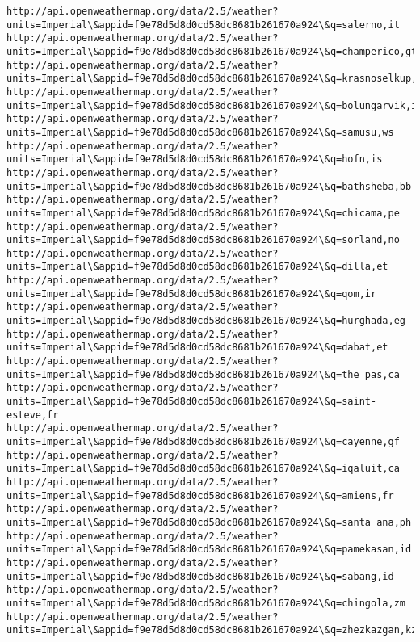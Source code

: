 \documentclass[11pt]{article}
\begin{document}
\begin{Verbatim}[commandchars=\\\{\}]
http://api.openweathermap.org/data/2.5/weather?units=Imperial\&appid=f9e78d5d8d0cd58dc8681b261670a924\&q=salerno,it
http://api.openweathermap.org/data/2.5/weather?units=Imperial\&appid=f9e78d5d8d0cd58dc8681b261670a924\&q=champerico,gt
http://api.openweathermap.org/data/2.5/weather?units=Imperial\&appid=f9e78d5d8d0cd58dc8681b261670a924\&q=krasnoselkup,ru
http://api.openweathermap.org/data/2.5/weather?units=Imperial\&appid=f9e78d5d8d0cd58dc8681b261670a924\&q=bolungarvik,is
http://api.openweathermap.org/data/2.5/weather?units=Imperial\&appid=f9e78d5d8d0cd58dc8681b261670a924\&q=samusu,ws
http://api.openweathermap.org/data/2.5/weather?units=Imperial\&appid=f9e78d5d8d0cd58dc8681b261670a924\&q=hofn,is
http://api.openweathermap.org/data/2.5/weather?units=Imperial\&appid=f9e78d5d8d0cd58dc8681b261670a924\&q=bathsheba,bb
http://api.openweathermap.org/data/2.5/weather?units=Imperial\&appid=f9e78d5d8d0cd58dc8681b261670a924\&q=chicama,pe
http://api.openweathermap.org/data/2.5/weather?units=Imperial\&appid=f9e78d5d8d0cd58dc8681b261670a924\&q=sorland,no
http://api.openweathermap.org/data/2.5/weather?units=Imperial\&appid=f9e78d5d8d0cd58dc8681b261670a924\&q=dilla,et
http://api.openweathermap.org/data/2.5/weather?units=Imperial\&appid=f9e78d5d8d0cd58dc8681b261670a924\&q=qom,ir
http://api.openweathermap.org/data/2.5/weather?units=Imperial\&appid=f9e78d5d8d0cd58dc8681b261670a924\&q=hurghada,eg
http://api.openweathermap.org/data/2.5/weather?units=Imperial\&appid=f9e78d5d8d0cd58dc8681b261670a924\&q=dabat,et
http://api.openweathermap.org/data/2.5/weather?units=Imperial\&appid=f9e78d5d8d0cd58dc8681b261670a924\&q=the pas,ca
http://api.openweathermap.org/data/2.5/weather?units=Imperial\&appid=f9e78d5d8d0cd58dc8681b261670a924\&q=saint-esteve,fr
http://api.openweathermap.org/data/2.5/weather?units=Imperial\&appid=f9e78d5d8d0cd58dc8681b261670a924\&q=cayenne,gf
http://api.openweathermap.org/data/2.5/weather?units=Imperial\&appid=f9e78d5d8d0cd58dc8681b261670a924\&q=iqaluit,ca
http://api.openweathermap.org/data/2.5/weather?units=Imperial\&appid=f9e78d5d8d0cd58dc8681b261670a924\&q=amiens,fr
http://api.openweathermap.org/data/2.5/weather?units=Imperial\&appid=f9e78d5d8d0cd58dc8681b261670a924\&q=santa ana,ph
http://api.openweathermap.org/data/2.5/weather?units=Imperial\&appid=f9e78d5d8d0cd58dc8681b261670a924\&q=pamekasan,id
http://api.openweathermap.org/data/2.5/weather?units=Imperial\&appid=f9e78d5d8d0cd58dc8681b261670a924\&q=sabang,id
http://api.openweathermap.org/data/2.5/weather?units=Imperial\&appid=f9e78d5d8d0cd58dc8681b261670a924\&q=chingola,zm
http://api.openweathermap.org/data/2.5/weather?units=Imperial\&appid=f9e78d5d8d0cd58dc8681b261670a924\&q=zhezkazgan,kz

\end{Verbatim}
\end{document}
